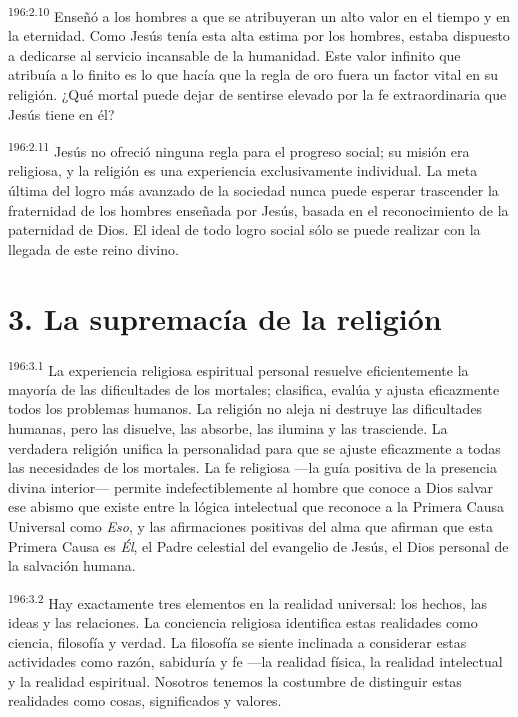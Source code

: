 \par
\textsuperscript{196:2.10} Enseñó a los hombres a que se atribuyeran un alto valor en el tiempo y en la eternidad. Como Jesús tenía esta alta estima por los hombres, estaba dispuesto a dedicarse al servicio incansable de la humanidad. Este valor infinito que atribuía a lo finito es lo que hacía que la regla de oro fuera un factor vital en su religión. ¿Qué mortal puede dejar de sentirse elevado por la fe extraordinaria que Jesús tiene en él?

\par
\textsuperscript{196:2.11} Jesús no ofreció ninguna regla para el progreso social; su misión era religiosa, y la religión es una experiencia exclusivamente individual. La meta última del logro más avanzado de la sociedad nunca puede esperar trascender la fraternidad de los hombres enseñada por Jesús, basada en el reconocimiento de la paternidad de Dios. El ideal de todo logro social sólo se puede realizar con la llegada de este reino divino.

\section*{3. La supremacía de la religión}
\par
\textsuperscript{196:3.1} La experiencia religiosa espiritual personal resuelve eficientemente la mayoría de las dificultades de los mortales; clasifica, evalúa y ajusta eficazmente todos los problemas humanos. La religión no aleja ni destruye las dificultades humanas, pero las disuelve, las absorbe, las ilumina y las trasciende. La verdadera religión unifica la personalidad para que se ajuste eficazmente a todas las necesidades de los mortales. La fe religiosa ---la guía positiva de la presencia divina interior--- permite indefectiblemente al hombre que conoce a Dios salvar ese abismo que existe entre la lógica intelectual que reconoce a la Primera Causa Universal como \textit{Eso}, y las afirmaciones positivas del alma que afirman que esta Primera Causa es \textit{Él}, el Padre celestial del evangelio de Jesús, el Dios personal de la salvación humana.

\par
\textsuperscript{196:3.2} Hay exactamente tres elementos en la realidad universal: los hechos, las ideas y las relaciones. La conciencia religiosa identifica estas realidades como ciencia, filosofía y verdad. La filosofía se siente inclinada a considerar estas actividades como razón, sabiduría y fe ---la realidad física, la realidad intelectual y la realidad espiritual. Nosotros tenemos la costumbre de distinguir estas realidades como cosas, significados y valores.


